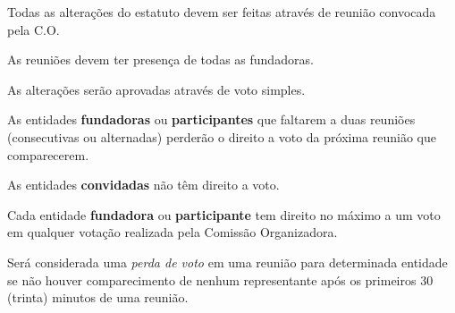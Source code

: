 \begin{article}
	Todas as alterações do estatuto devem ser feitas através de reunião convocada pela C.O.

	\begin{xparagraph}
		As reuniões devem ter presença de todas as fundadoras.
	\end{xparagraph}

	\begin{xparagraph}
		As alterações serão aprovadas através de voto simples.
	\end{xparagraph}
\end{article}

\begin{article}
	As entidades \textbf{fundadoras} ou \textbf{participantes} que faltarem a duas reuniões (consecutivas ou alternadas) perderão o direito a voto da próxima reunião que comparecerem.

	\begin{xparagraph}
		As entidades \textbf{convidadas} não têm direito a voto.
	\end{xparagraph}

	\begin{xparagraph}
		Cada entidade \textbf{fundadora} ou \textbf{participante} tem direito no máximo a um voto em qualquer votação realizada pela Comissão Organizadora.
	\end{xparagraph}

	\begin{xparagraph}
		Será considerada uma \textit{perda de voto} em uma reunião para determinada entidade se não houver comparecimento de nenhum representante após os primeiros 30 (trinta) minutos de uma reunião.
	\end{xparagraph}
\end{article}

